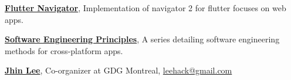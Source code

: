 \documentclass[letterpaper,11pt]{article}
\begin{document}

\href{https://medium.com/flutter-community/lets-make-the-flutter-navigator-2-bc5953251c3e?source=friends_link&sk=e1ff30235ab93276b558c5b5ef1dd15f}
{\textbf{Flutter Navigator}}, Implementation of navigator 2 for flutter focuses on web apps.

\Gap
\href{https://medium.com/flutter-community/the-software-engineering-approach-in-cross-platform-programming-with-flutter-part-1-efcdc8a8fc26?source=friends_link&sk=ceb60f56685ce66c7f9574595748f25b}
{\textbf{Software Engineering Principles}}, A series detailing software engineering methods for cross-platform apps.



\href{https://linkedin.com/in/leehack}
{\textbf{Jhin Lee}}, Co-organizer at GDG Montreal, \href{mailto:leehack@gmail.com}{leehack@gmail.com}










\end{document}
